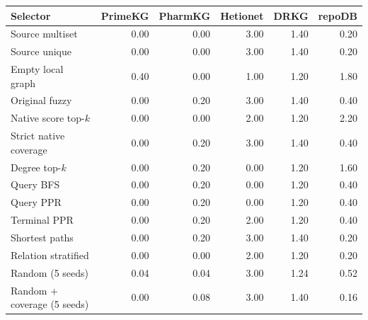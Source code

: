 \begin{tabular}{lrrrrr}
\toprule
Selector & PrimeKG & PharmKG & Hetionet & DRKG & repoDB \\
\midrule
Source multiset & 0.00 & 0.00 & 3.00 & 1.40 & 0.20 \\
Source unique & 0.00 & 0.00 & 3.00 & 1.40 & 0.20 \\
Empty local graph & 0.40 & 0.00 & 1.00 & 1.20 & 1.80 \\
Original fuzzy & 0.00 & 0.20 & 3.00 & 1.40 & 0.40 \\
Native score top-$k$ & 0.00 & 0.00 & 2.00 & 1.20 & 2.20 \\
Strict native coverage & 0.00 & 0.20 & 3.00 & 1.40 & 0.40 \\
Degree top-$k$ & 0.00 & 0.20 & 0.00 & 1.20 & 1.60 \\
Query BFS & 0.00 & 0.20 & 0.00 & 1.20 & 0.40 \\
Query PPR & 0.00 & 0.20 & 0.00 & 1.20 & 0.40 \\
Terminal PPR & 0.00 & 0.20 & 2.00 & 1.20 & 0.40 \\
Shortest paths & 0.00 & 0.20 & 3.00 & 1.40 & 0.20 \\
Relation stratified & 0.00 & 0.00 & 2.00 & 1.20 & 0.20 \\
Random (5 seeds) & 0.04 & 0.04 & 3.00 & 1.24 & 0.52 \\
Random + coverage (5 seeds) & 0.00 & 0.08 & 3.00 & 1.40 & 0.16 \\
\bottomrule
\end{tabular}
